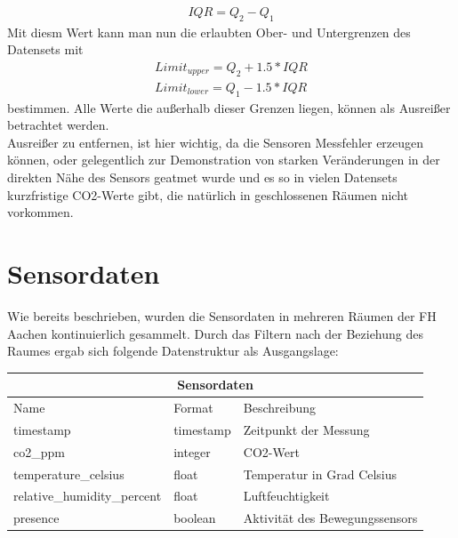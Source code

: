 \begin{align}
    IQR = Q_2 - Q_1
\end{align}
Mit diesm Wert kann man nun die erlaubten Ober- und Untergrenzen 
des Datensets mit 
\begin{align}
    Limit_{upper} = Q_2 + 1.5 * IQR \\
    Limit_{lower} = Q_1 - 1.5 * IQR
\end{align} 
bestimmen. Alle Werte die außerhalb dieser Grenzen liegen, können als Ausreißer betrachtet werden.\\
Ausreißer zu entfernen, ist hier wichtig, da die Sensoren Messfehler erzeugen können, oder gelegentlich zur 
Demonstration von starken Veränderungen in der direkten Nähe des Sensors geatmet wurde und es so in vielen 
Datensets kurzfristige CO2-Werte gibt, die natürlich in geschlossenen Räumen nicht vorkommen.

\begin{minipage}{\textwidth}
    \section{Sensordaten}
    Wie bereits beschrieben, wurden die Sensordaten in mehreren Räumen der FH Aachen kontinuierlich 
    gesammelt. Durch das Filtern nach der Beziehung des Raumes ergab sich folgende Datenstruktur als
    Ausgangslage:\\
    
    \begin{tabular}{|p{4.5cm}||p{3cm}|p{7cm}|}
        \hline
        \multicolumn{3}{|c|}{Sensordaten} \\
        \hline
        Name&Format &Beschreibung\\
        \hline
        timestamp&timestamp&Zeitpunkt der Messung\\
        co2\_ppm&integer&CO2-Wert\\
        temperature\_celsius&float&Temperatur in Grad Celsius\\
        relative\_humidity\_percent&float&Luftfeuchtigkeit\\
        presence&boolean&Aktivität des Bewegungssensors\\
        \hline
    \end{tabular}     
\end{minipage}

